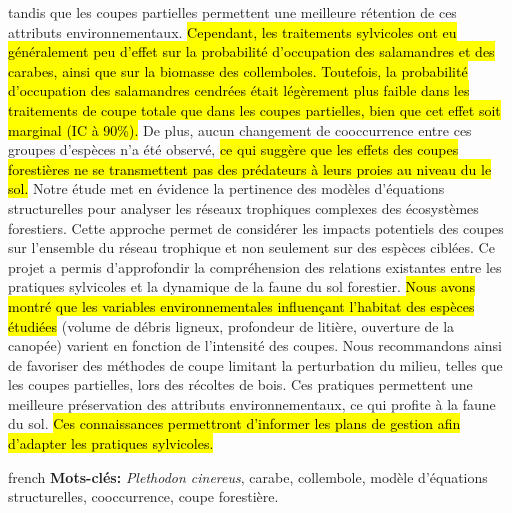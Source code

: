tandis que les coupes partielles permettent une meilleure rétention de ces attributs environnementaux. 
\hl{Cependant, les traitements sylvicoles ont eu généralement peu d’effet sur la probabilité d’occupation des salamandres et des carabes, ainsi que sur la biomasse des collemboles. 
Toutefois, la probabilité d’occupation des salamandres cendrées était légèrement plus faible dans les traitements de coupe totale que dans les coupes partielles, bien que cet effet soit marginal (IC à 90\%).}
De plus, aucun changement de cooccurrence entre ces groupes d’espèces n’a été observé, \hl{ce qui suggère que les effets des coupes forestières ne se transmettent pas des prédateurs à leurs proies au niveau du le sol. }
Notre étude met en évidence la pertinence des modèles d’équations structurelles pour analyser les réseaux trophiques complexes des écosystèmes forestiers. 
Cette approche permet de considérer les impacts potentiels des coupes sur l’ensemble du réseau trophique et non seulement sur des espèces ciblées. 
Ce projet a permis d’approfondir la compréhension des relations existantes entre les pratiques sylvicoles et la dynamique de la faune du sol forestier. 
\hl{Nous avons montré que les variables environnementales influençant l’habitat des espèces étudiées} (volume de débris ligneux, profondeur de litière, ouverture de la canopée) varient en fonction de l’intensité des coupes. 
Nous recommandons ainsi de favoriser des méthodes de coupe limitant la perturbation du milieu, telles que les coupes partielles, lors des récoltes de bois. 
Ces pratiques permettent une meilleure préservation des attributs environnementaux, ce qui profite à la faune du sol. 
\hl{Ces connaissances permettront d’informer les plans de gestion afin d’adapter les pratiques sylvicoles.}


\begin{otherlanguage*}{french}
\textbf{Mots-clés:} \textit{Plethodon cinereus}, carabe, collembole, modèle d'équations structurelles, cooccurrence, coupe forestière.
\end{otherlanguage*}
